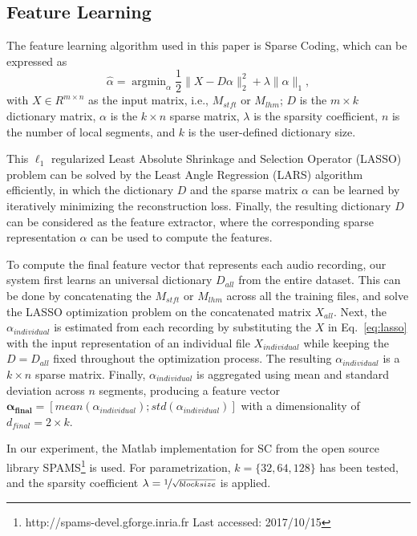 \documentclass[conference]{IEEEtran}
\begin{document}
\subsection{Feature Learning}\label{subsec:feat_learn}
The feature learning algorithm used in this paper is Sparse Coding, which can be expressed as %
\begin{equation}\label{eq:lasso}
\hat{\alpha} = \mathop{\mathrm{argmin}}_\alpha \frac{1}{2} \| X - D\alpha \|_{2}^{2} + \lambda \| \alpha \|_{1}, 
\end{equation}
%
with $X \in R^{ m \times n}$ as the input matrix, i.e., $M_{stft}$ or $M_{lhm}$; $D$ is the $m \times k$ dictionary matrix, $\alpha$ is the $k \times n$ sparse matrix, $\lambda$ is the sparsity coefficient, $n$ is the number of local segments, and $k$ is the user-defined dictionary size. 

This $\ell_1$ regularized Least Absolute Shrinkage and Selection Operator (LASSO) problem can be solved by the Least Angle Regression (LARS) algorithm efficiently\cite{Efron2004}, in which the dictionary $D$ and the sparse matrix $\alpha$ can be learned by iteratively minimizing the reconstruction loss. Finally, the resulting dictionary $D$ can be considered as the feature extractor, where the corresponding sparse representation $\alpha$ can be used to compute the features. 

To compute the final feature vector that represents each audio recording, our system first learns an universal dictionary $D_{all}$ from the entire dataset. This can be done by concatenating the $M_{stft}$ or $M_{lhm}$ across all the training files, and solve the LASSO optimization problem on the concatenated matrix $X_{all}$. Next, the $\alpha_{individual}$ is estimated from each recording by substituting the $X$ in Eq.~\ref{eq:lasso} with the input representation of an individual file $X_{individual}$ while keeping the $D = D_{all}$ fixed throughout the optimization process. The resulting $\alpha_{individual}$ is a $k \times n$ sparse matrix. Finally, $\alpha_{individual}$ is aggregated using mean and standard deviation across $n$ segments, producing a feature vector $\mathbf{\alpha_{final}} = [mean(\alpha_{individual}); std(\alpha_{individual})]$ with a dimensionality of $d_{final} = 2 \times k$.  

In our experiment, the Matlab implementation for SC from the open source library SPAMS\footnote{http://spams-devel.gforge.inria.fr Last accessed: 2017/10/15}\cite{Mairal2009a} is used. For parametrization, $k = \{32, 64, 128\}$ has been tested, and the sparsity coefficient $\lambda = \nicefrac{1}{\sqrt{block size}}$ is applied. 
\end{document}
